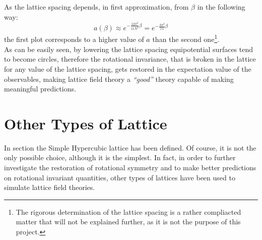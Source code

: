 As the lattice spacing depends, in first approximation, from $\beta$ in the following way:
\begin{equation}
    a(\beta) \approx e^{-\frac{12\pi^2}{11N^2}\beta} = e^{-\frac{3\pi^2}{11}\beta} \label{3:BetaLatticeSpacing} 
\end{equation}
the first plot corresponds to a higher value of $a$ than the second one\footnote{The rigorous determination of the lattice spacing is a rather compliacted matter that will not be explained further, as it is not the purpose of this project.}.\\
As can be easily seen, by lowering the lattice spacing equipotential surfaces tend to become circles, therefore the rotational invariance, that is broken in the lattice for any value of the lattice spacing, gets restored in the expectation value of the observables, making lattice field theory a \emph{``good''} theory capable of making meaningful predictions.

\section{Other Types of Lattice\label{Sec3:Lattices}}
In section the Simple Hypercubic lattice has been defined.
Of course, it is not the only possible choice, although it is the simplest.
In fact, in order to further investigate the restoration of rotational symmetry and to make better predictions on rotational invariant quantities, other types of lattices have been used to simulate lattice field theories.

